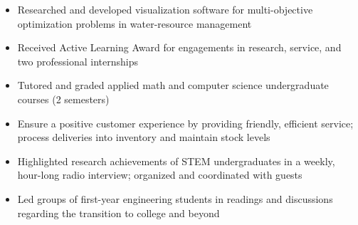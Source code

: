 \documentclass[10pt,letterpaper,ragged2e,withhyper]{altacv}
\begin{document}
\begin{paracol}{2}
  \vspace{-0.75em}
  \divider

  \begin{itemize}
    \item Researched and developed visualization software for multi-objective optimization problems in water-resource management
    \item Received Active Learning Award for engagements in research, service, and two professional internships
    \item Tutored and graded applied math and computer science undergraduate courses (2 semesters)
  \end{itemize}

  \medskip

  \begin{itemize}
    \item Ensure a positive customer experience by providing friendly, efficient service; process deliveries into inventory and maintain stock levels
  \end{itemize}

  \vspace{-0.75em}
  \divider

  \begin{itemize}
    \item Highlighted research achievements of STEM undergraduates in a weekly, hour-long radio interview; organized and coordinated with guests
  \end{itemize}

  \vspace{-0.75em}
  \divider

  \begin{itemize}
    \item Led groups of first-year engineering students in readings and discussions regarding the transition to college and beyond
  \end{itemize}

  \switchcolumn


\end{paracol}
\end{document}
